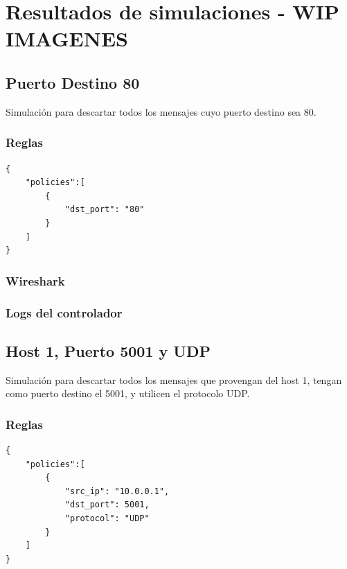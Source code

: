 \documentclass{article}
\begin{document}
\section{Resultados de simulaciones - WIP IMAGENES}\label{pruebas-wip}

\subsection{Puerto Destino 80}
Simulación para descartar todos los mensajes cuyo puerto destino sea 80.

\subsubsection{Reglas}
\begin{verbatim}
{
    "policies":[
        {
            "dst_port": "80"
        }
    ]
}
\end{verbatim}

\subsubsection{Wireshark}
\begin{center}
\end{center}

\subsubsection{Logs del controlador}
\begin{center}
\end{center}

\subsection{Host 1, Puerto 5001 y UDP}
Simulación para descartar todos los mensajes que provengan del host 1, tengan como puerto destino el 5001, y utilicen el protocolo UDP.

\subsubsection{Reglas}
\begin{verbatim}
{
    "policies":[
        {
            "src_ip": "10.0.0.1",
            "dst_port": 5001,
            "protocol": "UDP"
        }
    ]
}
\end{verbatim}
\end{document}
